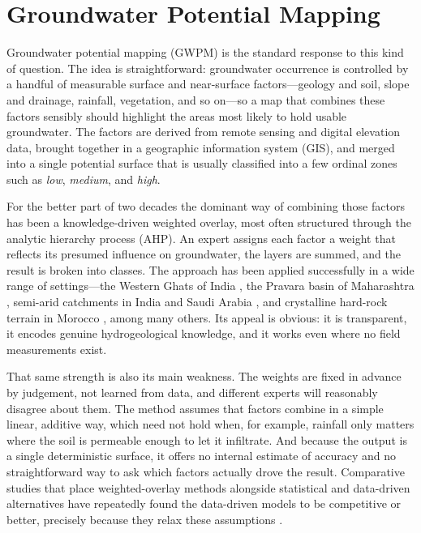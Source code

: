 \section{Groundwater Potential Mapping}
\label{sec:gwpm}

Groundwater potential mapping (GWPM) is the standard response to this kind of
question. The idea is straightforward: groundwater occurrence is controlled by
a handful of measurable surface and near-surface factors---geology and soil,
slope and drainage, rainfall, vegetation, and so on---so a map that combines
these factors sensibly should highlight the areas most likely to hold usable
groundwater. The factors are derived from remote sensing and digital elevation
data, brought together in a geographic information system (GIS), and merged
into a single potential surface that is usually classified into a few ordinal
zones such as \emph{low}, \emph{medium}, and \emph{high}.

For the better part of two decades the dominant way of combining those factors
has been a knowledge-driven weighted overlay, most often structured through the
analytic hierarchy process (AHP). An expert assigns each factor a weight that
reflects its presumed influence on groundwater, the layers are summed, and the
result is broken into classes. The approach has been applied successfully in a
wide range of settings---the Western Ghats of India \cite{arulbalaji2019gisahp},
the Pravara basin of Maharashtra \cite{das2018pravara}, semi-arid catchments in
India and Saudi Arabia \cite{pande2021ahpmif,mallick2019fuzzyahp}, and
crystalline hard-rock terrain in Morocco \cite{benjmel2020morocco}, among many
others. Its appeal is obvious: it is transparent, it encodes genuine hydrogeological
knowledge, and it works even where no field measurements exist.

That same strength is also its main weakness. The weights are fixed in advance
by judgement, not learned from data, and different experts will reasonably
disagree about them. The method assumes that factors combine in a simple linear,
additive way, which need not hold when, for example, rainfall only matters where
the soil is permeable enough to let it infiltrate. And because the output is a
single deterministic surface, it offers no internal estimate of accuracy and no
straightforward way to ask which factors actually drove the result. Comparative
studies that place weighted-overlay methods alongside statistical and
data-driven alternatives have repeatedly found the data-driven models to be
competitive or better, precisely because they relax these assumptions
\cite{arabameri2018shahroud}.

